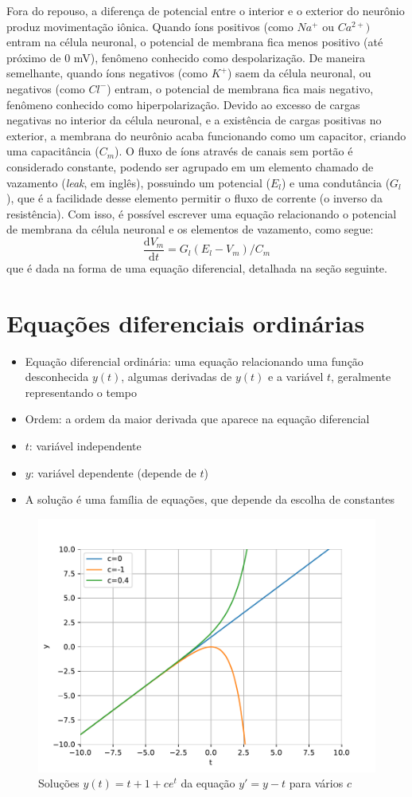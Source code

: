 Fora do repouso, a diferença de potencial entre o interior e o exterior do neurônio produz movimentação iônica. Quando íons positivos (como $Na^+$ ou $Ca^{2+})$ entram na célula neuronal, o potencial de membrana fica menos positivo (até próximo de 0 mV), fenômeno conhecido como despolarização. De maneira semelhante, quando íons negativos (como $K^+$) saem da célula neuronal, ou negativos (como $Cl^-$) entram, o potencial de membrana fica mais negativo, fenômeno conhecido como hiperpolarização. Devido ao excesso de cargas negativas no interior da célula neuronal, e a existência de cargas positivas no exterior, a membrana do neurônio acaba funcionando como um capacitor, criando uma capacitância ($C_m$). O fluxo de íons através de canais sem portão é considerado constante, podendo ser agrupado em um elemento chamado de vazamento (\textit{leak}, em inglês), possuindo um potencial ($E_l$) e uma condutância ($G_l$), que é a facilidade desse elemento permitir o fluxo de corrente (o inverso da resistência). Com isso, é possível escrever uma equação relacionando o potencial de membrana da célula neuronal e os elementos de vazamento, como segue:
$$
\frac{\mathrm{d}V_m}{\mathrm{d}t}=G_l(E_l-V_m)/C_m
$$
que é dada na forma de uma equação diferencial, detalhada na seção seguinte.

\section{Equações diferenciais ordinárias}\label{sec:eqdif}
\begin{itemize}
	\item Equação diferencial ordinária: uma equação relacionando uma função desconhecida $y(t)$, algumas derivadas de $y(t)$ e a variável $t$, geralmente representando o tempo \cite{adkins_ordinary_2012}
	\item Ordem: a ordem da maior derivada que aparece na equação diferencial
	\item $t$: variável independente
	\item $y$: variável dependente (depende de $t$)
	\item A solução é uma família de equações, que depende da escolha de constantes
\end{itemize}

\begin{figure}[htb!]
	\centering
	\caption{Soluções $y(t) = t + 1 + ce^t$ da equação $y'=y-t$ para vários $c$}
	\label{fig:solucao}
	\includegraphics[width=0.7\linewidth]{figs/solucao}
\end{figure}


